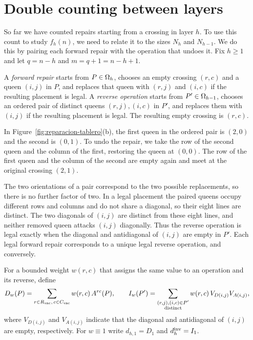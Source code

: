 \section{Double counting between layers}\label{sec:doblecuenta}

So far we have counted repairs starting from a crossing in layer $h$. To use this count to study $f_h(n)$,
we need to relate it to the
sizes $N_h$ and $N_{h-1}$. We do this by pairing each forward repair with the operation that undoes it. Fix
$h\ge1$ and let $q=n-h$ and
$m=q+1=n-h+1$.

\begin{definicion}\label{def:reparaciones} A \emph{forward repair}
starts from $P\in\Omega_h$,
chooses an empty crossing $(r,c)$ and a queen $(i,j)$ in $P$, and replaces that queen with $(r,j)$ and
$(i,c)$ if the resulting
placement is legal. A \emph{reverse operation} starts from $P'\in\Omega_{h-1}$, chooses an ordered pair of
distinct queens $(r,j),(i,c)$
in $P'$, and replaces them with $(i,j)$ if the resulting placement is legal. The resulting empty crossing is
$(r,c)$. \end{definicion}

In Figure~\ref{fig:reparacion-tablero}(b), the first queen in the ordered pair is $(2,0)$ and the second is
$(0,1)$. To undo the
repair, we take the row of the second queen and the column of the first, restoring the queen at $(0,0)$. The
row of the first queen and
the column of the second are empty again and meet at the original crossing $(2,1)$.

The two orientations of a pair correspond to the two possible replacements, so there is no further factor of
two. In a legal placement
the paired queens occupy different rows and columns and do not share a diagonal, so their eight lines are
distinct. The two diagonals
of $(i,j)$ are distinct from these eight lines, and neither removed queen attacks $(i,j)$ diagonally. Thus
the reverse operation is
legal exactly when the diagonal and antidiagonal of $(i,j)$ are empty in $P'$. Each legal forward repair
corresponds to a unique legal
reverse operation, and conversely.

For a bounded weight $w(r,c)$ that assigns the same value to an operation and its reverse, define \[
 D_w(P)=\sum_{r\in R_{\mathrm{vac}},\,c\in C_{\mathrm{vac}}}w(r,c)\,A^{rc}(P),\qquad
 I_w(P')=\sum_{\substack{(r,j),(i,c)\in P'\\ \text{distinct}}}w(r,c)\,V_{D(i,j)}V_{A(i,j)},
\] where $V_{D(i,j)}$ and $V_{A(i,j)}$ indicate that the diagonal and antidiagonal of $(i,j)$ are empty,
respectively. For $w\equiv1$
write $d_{h,1}=D_1$ and $d_h^{\mathrm{inv}}=I_1$.

